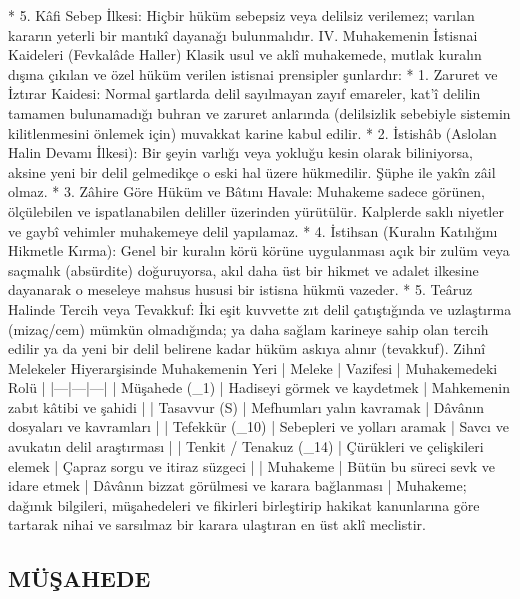 \documentclass[11pt,a4paper]{article}
\begin{document}
 * 5. Kâfi Sebep İlkesi:
   Hiçbir hüküm sebepsiz veya delilsiz verilemez; varılan kararın yeterli bir mantıkî dayanağı bulunmalıdır.
IV. Muhakemenin İstisnai Kaideleri (Fevkalâde Haller)
Klasik usul ve aklî muhakemede, mutlak kuralın dışına çıkılan ve özel hüküm verilen istisnai prensipler şunlardır:
 * 1. Zaruret ve İztırar Kaidesi:
   Normal şartlarda delil sayılmayan zayıf emareler, kat'î delilin tamamen bulunamadığı buhran ve zaruret anlarında (delilsizlik sebebiyle sistemin kilitlenmesini önlemek için) muvakkat karine kabul edilir.
 * 2. İstishâb (Aslolan Halin Devamı İlkesi):
   Bir şeyin varlığı veya yokluğu kesin olarak biliniyorsa, aksine yeni bir delil gelmedikçe o eski hal üzere hükmedilir. Şüphe ile yakîn zâil olmaz.
 * 3. Zâhire Göre Hüküm ve Bâtını Havale:
   Muhakeme sadece görünen, ölçülebilen ve ispatlanabilen deliller üzerinden yürütülür. Kalplerde saklı niyetler ve gaybî vehimler muhakemeye delil yapılamaz.
 * 4. İstihsan (Kuralın Katılığını Hikmetle Kırma):
   Genel bir kuralın körü körüne uygulanması açık bir zulüm veya saçmalık (absürdite) doğuruyorsa, akıl daha üst bir hikmet ve adalet ilkesine dayanarak o meseleye mahsus hususi bir istisna hükmü vazeder.
 * 5. Teâruz Halinde Tercih veya Tevakkuf:
   İki eşit kuvvette zıt delil çatıştığında ve uzlaştırma (mizaç/cem) mümkün olmadığında; ya daha sağlam karineye sahip olan tercih edilir ya da yeni bir delil belirene kadar hüküm askıya alınır (tevakkuf).
Zihnî Melekeler Hiyerarşisinde Muhakemenin Yeri
| Meleke | Vazifesi | Muhakemedeki Rolü |
|---|---|---|
| Müşahede (_1) | Hadiseyi görmek ve kaydetmek | Mahkemenin zabıt kâtibi ve şahidi |
| Tasavvur (S) | Mefhumları yalın kavramak | Dâvânın dosyaları ve kavramları |
| Tefekkür (_{10}) | Sebepleri ve yolları aramak | Savcı ve avukatın delil araştırması |
| Tenkit / Tenakuz (_{14}) | Çürükleri ve çelişkileri elemek | Çapraz sorgu ve itiraz süzgeci |
| Muhakeme | Bütün bu süreci sevk ve idare etmek | Dâvânın bizzat görülmesi ve karara bağlanması |
Muhakeme; dağınık bilgileri, müşahedeleri ve fikirleri birleştirip hakikat kanunlarına göre tartarak nihai ve sarsılmaz bir karara ulaştıran en üst aklî meclistir.





\subsection{MÜŞAHEDE}
\end{document}
